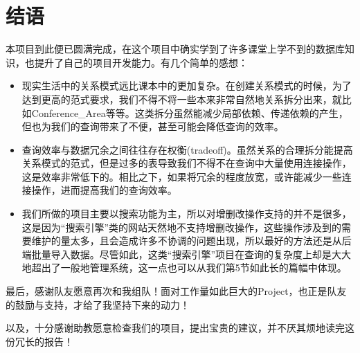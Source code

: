 
\section{结语}

本项目到此便已圆满完成，在这个项目中确实学到了许多课堂上学不到的数据库知识，也提升了自己的项目开发能力。有几个简单的感想：
\begin{itemize}
\item 现实生活中的关系模式远比课本中的更加复杂。在创建关系模式的时候，为了达到更高的范式要求，我们不得不将一些本来非常自然地关系拆分出来，就比如Conference\_Area等等。这类拆分虽然能减少局部依赖、传递依赖的产生，但也为我们的查询带来了不便，甚至可能会降低查询的效率。
\item 查询效率与数据冗余之间往往存在权衡(tradeoff)。虽然关系的合理拆分能提高关系模式的范式，但是过多的表导致我们不得不在查询中大量使用连接操作，这是效率非常低下的。相比之下，如果将冗余的程度放宽，或许能减少一些连接操作，进而提高我们的查询效率。
\item 我们所做的项目主要以搜索功能为主，所以对增删改操作支持的并不是很多，这是因为“搜索引擎”类的网站天然地不支持增删改操作，这些操作涉及到的需要维护的量太多，且会造成许多不协调的问题出现，所以最好的方法还是从后端批量导入数据。尽管如此，这类“搜索引擎”项目在查询的复杂度上却是大大地超出了一般地管理系统，这一点也可以从我们第5节如此长的篇幅中体现。
\end{itemize}

最后，感谢队友愿意再次和我组队！面对工作量如此巨大的Project，也正是队友的鼓励与支持，才给了我坚持下来的动力！

以及，十分感谢助教愿意检查我们的项目，提出宝贵的建议，并不厌其烦地读完这份冗长的报告！